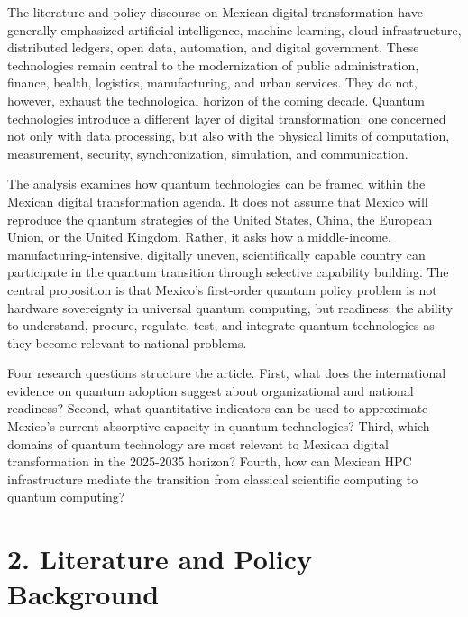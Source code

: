 \documentclass[
  11pt,
  letterpaper,
]{article}
\begin{document}
The literature and policy discourse on Mexican digital transformation
have generally emphasized artificial intelligence, machine learning,
cloud infrastructure, distributed ledgers, open data, automation, and
digital government. These technologies remain central to the
modernization of public administration, finance, health, logistics,
manufacturing, and urban services. They do not, however, exhaust the
technological horizon of the coming decade. Quantum technologies
introduce a different layer of digital transformation: one concerned not
only with data processing, but also with the physical limits of
computation, measurement, security, synchronization, simulation, and
communication.

The analysis examines how quantum technologies can be framed within the
Mexican digital transformation agenda. It does not assume that Mexico
will reproduce the quantum strategies of the United States, China, the
European Union, or the United Kingdom. Rather, it asks how a
middle-income, manufacturing-intensive, digitally uneven, scientifically
capable country can participate in the quantum transition through
selective capability building. The central proposition is that Mexico's
first-order quantum policy problem is not hardware sovereignty in
universal quantum computing, but readiness: the ability to understand,
procure, regulate, test, and integrate quantum technologies as they
become relevant to national problems.

Four research questions structure the article. First, what does the
international evidence on quantum adoption suggest about organizational
and national readiness? Second, what quantitative indicators can be used
to approximate Mexico's current absorptive capacity in quantum
technologies? Third, which domains of quantum technology are most
relevant to Mexican digital transformation in the 2025-2035 horizon?
Fourth, how can Mexican HPC infrastructure mediate the transition from
classical scientific computing to quantum computing?

\section{2. Literature and Policy
Background}\label{literature-and-policy-background}
\end{document}
